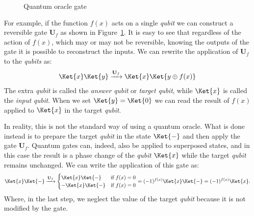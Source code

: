 \begin{figure}
	\centering
	\vspace{.3cm}
	\caption{Quantum oracle gate}
	\label{fig:oracle}
\end{figure}
For example, if the function $f(x)$ acts on a single \emph{qubit} we can construct a reversible gate $\mathbf{U}_f$ as shown in Figure~\ref{fig:oracle}. It is easy to see that regardless of the action of $f(x)$, which may or may not be reversible, knowing the outputs of the gate it is possible to reconstruct the inputs. We can rewrite the application of $\mathbf{U}_f$ to the \emph{qubits} as:
\[
\Ket{x}\Ket{y} \xrightarrow{\mathbf{U}_f} \Ket{x}\Ket{y \oplus f(x)}
\]
The extra \emph{qubit} is called the \emph{answer qubit} or \emph{target qubit}, while $\Ket{x}$ is called the \emph{input qubit}. When we set $\Ket{y} = \Ket{0}$ we can read the result of $f(x)$ applied to $\Ket{x}$ in the target \emph{qubit}.

In reality, this is not the standard way of using a quantum oracle. What is done instead is to prepare the target \emph{qubit} in the state $\Ket{-}$ and then apply the gate $\mathbf{U}_f$. Quantum gates can, indeed, also be applied to superposed states, and in this case the result is a phase change of the \emph{qubit} $\Ket{x}$ while the target \emph{qubit} remains unchanged. We can write the application of this gate as:
\[
\Ket{x} \Ket{-}\xrightarrow{\mathbf{U}_f} 
\begin{cases}
	\Ket{x} \Ket{-} & \text{if $f(x)=0$} \\
	-\Ket{x} \Ket{-} & \text{if $f(x)=0$}
\end{cases} = 
(-1)^{f(x)}\Ket{x} \Ket{-} = (-1)^{f(x)}\Ket{x}.
\]
Where, in the last step, we neglect the value of the target \emph{qubit} because it is not modified by the gate.

